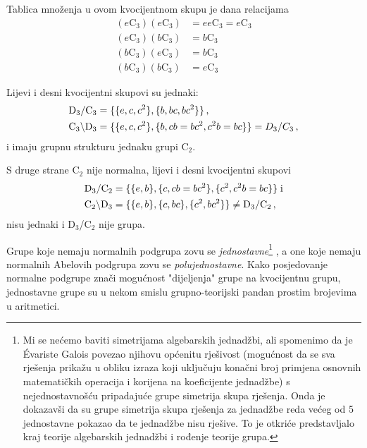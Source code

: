 \begin{primjer}
Tablica množenja u ovom kvocijentnom skupu je dana relacijama
\begin{align}
    (e\mathrm{C}_3)(e\mathrm{C}_3) &= ee \mathrm{C}_3 = e\mathrm{C}_3\\
    (e\mathrm{C}_3)(b\mathrm{C}_3) &= b\mathrm{C}_3  \\
    (b\mathrm{C}_3)(e\mathrm{C}_3) &= b\mathrm{C}_3  \\
    (b\mathrm{C}_3)(b\mathrm{C}_3) &= e\mathrm{C}_3 
\end{align}

Lijevi i desni kvocijentni skupovi su jednaki:
\begin{align*}
{\rm D}_{3}/{\rm C}_3 &= \{\{e,c,c^2\}, \{b, bc, bc^2\}\} \,, \\
{\rm C}_3\backslash{\rm D}_{3} &= \{\{e,c,c^2\}, \{b, cb=bc^2, c^2b=bc\}\}
    = D_{3}/C_3 \,,
\end{align*}
i imaju grupnu strukturu jednaku grupi $\mathrm{C}_2$.
\label{pr:D3oC3}
\end{primjer}

S druge strane $\mathrm{C}_2$ nije normalna, lijevi i desni kvocijentni
skupovi
\begin{align*}
    {\rm D}_{3}/{\rm C}_2 &= \{\{e,b\}, \{c, cb=bc^2\}, \{c^2, c^2b=bc\}\} \;\text{i} \\
{\rm C}_2\backslash{\rm D}_{3} &= \{\{e,b\}, \{c, bc\}, \{c^2, bc^2\}\}
    \neq {\rm D}_{3}/{\rm C}_2 \,,
\end{align*}
nisu jednaki i $\mathrm{D}_{3}$/$\mathrm{C}_2$ nije grupa.

Grupe koje nemaju normalnih podgrupa zovu se \emph{jednostavne}\footnote{Mi se
    nećemo baviti simetrijama algebarskih jednadžbi, ali spomenimo
    da je \'{E}variste Galois 
    povezao njihovu općenitu rješivost (mogućnost
    da se sva rješenja prikažu u obliku izraza koji uključuju konačni broj
    primjena osnovnih matematičkih operacija i korijena na
    koeficijente jednadžbe) s nejednostavnošću pripadajuće grupe simetrija
    skupa rješenja. Onda je dokazavši da su grupe simetrija skupa rješenja za jednadžbe reda
    većeg od 5 jednostavne pokazao da te jednadžbe nisu rješive. To je otkriće predstavljalo
kraj teorije algebarskih jednadžbi i rođenje teorije grupa.\label{fus:galois}} ,
  
a one koje nemaju normalnih Abelovih podgrupa zovu se \emph{polujednostavne}.
Kako posjedovanje normalne podgrupe znači mogućnost "dijeljenja" grupe na kvocijentnu
grupu, jednostavne grupe su u nekom smislu grupno-teorijski pandan prostim brojevima
u aritmetici.

